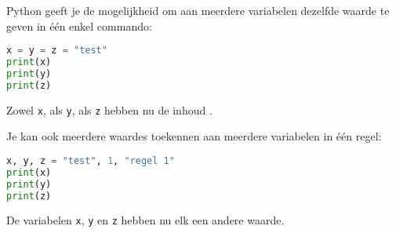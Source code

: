 Python geeft je de mogelijkheid om aan meerdere variabelen dezelfde waarde te geven in \'e\'en enkel commando:
\begin{lstlisting}[language=python]
x = y = z = "test"
print(x)
print(y)
print(z)
\end{lstlisting}
Zowel \texttt{x}, als \texttt{y}, als \texttt{z} hebben nu de inhoud .

Je kan ook meerdere waardes toekennen aan meerdere variabelen in \'e\'en regel:
\begin{lstlisting}[language=python]
x, y, z = "test", 1, "regel 1"
print(x)
print(y)
print(z)
\end{lstlisting}
De variabelen \texttt{x}, \texttt{y} en \texttt{z} hebben nu elk een andere waarde.

